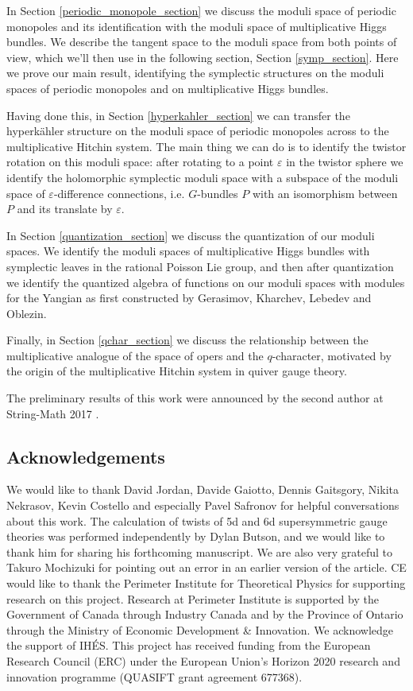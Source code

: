 \documentclass[11pt, oneside, reqno]{amsart}
\theoremstyle{definition} \newtheorem{definition}{Definition}[section]
\theoremstyle{definition} \newtheorem{remark}[definition]{Remark}
\theoremstyle{definition} \newtheorem{remarks}[definition]{Remarks}
\theoremstyle{definition} \newtheorem{question}[definition]{Question}
\theoremstyle{definition} \newtheorem*{note}{Note}
\theoremstyle{definition} \newtheorem{example}[definition]{Example}
\theoremstyle{definition} \newtheorem{examples}[definition]{Examples}
\newcommand{\eps}{\varepsilon}
\begin{document}
In Section \ref{periodic_monopole_section} we discuss the moduli space of periodic monopoles and its identification with the moduli space of multiplicative Higgs bundles.  We describe the tangent space to the moduli space from both points of view, which we'll then use in the following section, Section \ref{symp_section}.  Here we prove our main result, identifying the symplectic structures on the moduli spaces of periodic monopoles and on multiplicative Higgs bundles.

Having done this, in Section \ref{hyperkahler_section} we can transfer the hyperk\"ahler structure on the moduli space of periodic monopoles across to the multiplicative Hitchin system.  The main thing we can do is to identify the twistor rotation on this moduli space: after rotating to a point $\eps$ in the twistor sphere we identify the holomorphic symplectic moduli space with a subspace of the moduli space of $\eps$-difference connections, i.e. $G$-bundles $P$ with an isomorphism between $P$ and its translate by $\eps$.

In Section \ref{quantization_section} we discuss the quantization of our moduli spaces.  We identify the moduli spaces of multiplicative Higgs bundles with symplectic leaves in the rational Poisson Lie group, and then after quantization we identify the quantized algebra of functions on our moduli spaces with modules for the Yangian as first constructed by Gerasimov, Kharchev, Lebedev and Oblezin. 

Finally, in Section \ref{qchar_section} we discuss the relationship between the multiplicative analogue of the space of opers and the $q$-character, motivated by the origin of the multiplicative Hitchin system in quiver gauge theory.

The preliminary results of this work were announced by the second author at String-Math 2017 \cite{PestunStringMath}.

\subsection{Acknowledgements}
We would like to thank David Jordan, Davide Gaiotto, Dennis Gaitsgory, Nikita Nekrasov, Kevin Costello and especially Pavel Safronov for helpful conversations about this work. The calculation of twists of 5d and 6d supersymmetric gauge theories was performed independently by Dylan Butson, and we would like to thank him for sharing his forthcoming manuscript.  We are also very grateful to Takuro Mochizuki for pointing out an error in an earlier version of the article. CE would like to thank the Perimeter Institute for Theoretical Physics for supporting research on this project. Research at Perimeter Institute is supported by the Government of Canada through Industry Canada and by the Province of Ontario through the Ministry of Economic Development \& Innovation. We acknowledge the support of IH\'ES.  This project has received funding from the European Research Council (ERC) under the European Union's Horizon 2020 research and innovation programme (QUASIFT grant agreement 677368).
\end{document}
